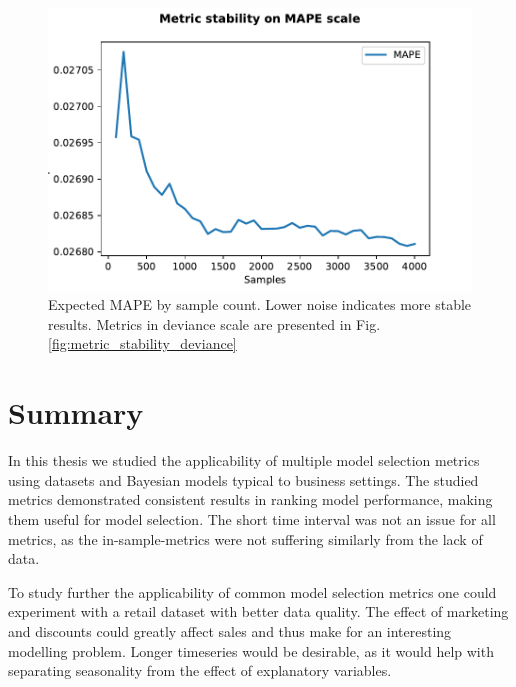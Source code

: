 \documentclass[english, 12pt, a4paper, sci, utf8, a-1b, online]{aaltothesis}
\begin{document}
\begin{figure}[hbt]
	\centering
	\includegraphics{../plots/stability/metric_stability_MAPE.pdf}
	\caption{\label{fig:metric_stability_mape}Expected MAPE by sample count. Lower noise indicates more stable results. Metrics in deviance scale are presented in Fig. \ref{fig:metric_stability_deviance}}
\end{figure}

\section{Summary} 



In this thesis we studied the applicability of multiple model selection metrics using datasets and Bayesian models typical to business settings. The studied metrics demonstrated consistent results in ranking model performance, making them useful for model selection. The short time interval was not an issue for all metrics, as the in-sample-metrics were not suffering similarly from the lack of data.

To study further the applicability of common model selection metrics one could experiment with a retail dataset with better data quality. The effect of marketing and discounts could greatly affect sales and thus make for an interesting modelling problem. Longer timeseries would be desirable, as it would help with separating seasonality from the effect of explanatory variables.
\end{document}
